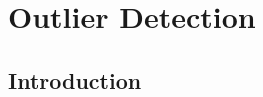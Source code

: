 \documentclass{article}
\begin{document}

\section{Outlier Detection}
\subsection{Introduction}
\end{document}
